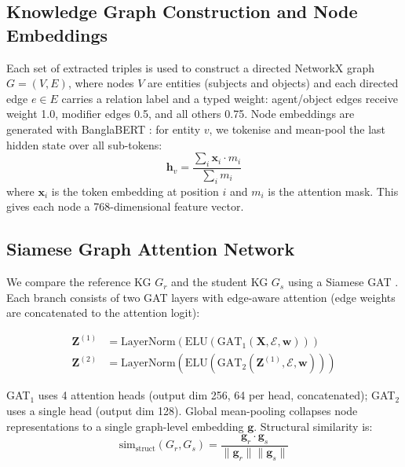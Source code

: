\documentclass[11pt]{article}
\begin{document}
\subsection{Knowledge Graph Construction and Node Embeddings}

Each set of extracted triples is used to construct a directed NetworkX graph $G = (V, E)$, where nodes $V$ are entities (subjects and objects) and each directed edge $e \in E$ carries a relation label and a typed weight: agent/object edges receive weight 1.0, modifier edges 0.5, and all others 0.75. Node embeddings are generated with BanglaBERT \citep{bhattacharjee-etal-2022-banglabert}: for entity $v$, we tokenise and mean-pool the last hidden state over all sub-tokens:
\begin{equation}
  \mathbf{h}_v = \frac{\sum_{i} \mathbf{x}_i \cdot m_i}{\sum_{i} m_i}
\end{equation}
where $\mathbf{x}_i$ is the token embedding at position $i$ and $m_i$ is the attention mask. This gives each node a 768-dimensional feature vector.

\subsection{Siamese Graph Attention Network}

We compare the reference KG $G_r$ and the student KG $G_s$ using a Siamese GAT \citep{velivckovic2018graph}. Each branch consists of two GAT layers with edge-aware attention (edge weights are concatenated to the attention logit):

\begin{align}
  \mathbf{Z}^{(1)} &= \mathrm{LayerNorm}\!\left(\mathrm{ELU}\!\left(\mathrm{GAT}_1(\mathbf{X}, \mathcal{E}, \mathbf{w})\right)\right) \\
  \mathbf{Z}^{(2)} &= \mathrm{LayerNorm}\!\left(\mathrm{ELU}\!\left(\mathrm{GAT}_2(\mathbf{Z}^{(1)}, \mathcal{E}, \mathbf{w})\right)\right)
\end{align}

GAT$_1$ uses 4 attention heads (output dim 256, 64 per head, concatenated); GAT$_2$ uses a single head (output dim 128). Global mean-pooling collapses node representations to a single graph-level embedding $\mathbf{g}$. Structural similarity is:
\begin{equation}
  \mathrm{sim}_\mathrm{struct}(G_r, G_s) = \frac{\mathbf{g}_r \cdot \mathbf{g}_s}{\|\mathbf{g}_r\| \|\mathbf{g}_s\|}
\end{equation}
\end{document}
